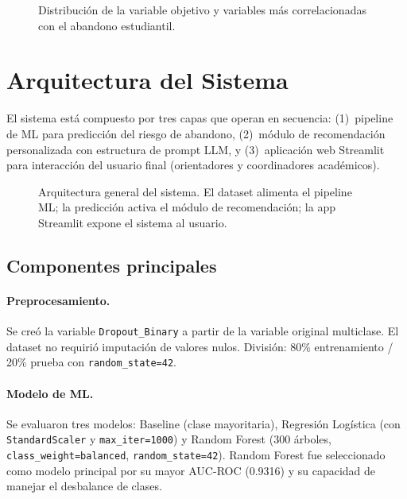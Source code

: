 \documentclass[10pt,twocolumn]{article}
\begin{document}
\begin{figure}[H]
  \centering
  \fbox{\rule{0pt}{2.8cm}\rule{\columnwidth-2\fboxsep}{0pt}}
  \caption{Distribución de la variable objetivo y variables más
           correlacionadas con el abandono estudiantil.}
  \label{fig:eda}
\end{figure}

\section{Arquitectura del Sistema}

El sistema está compuesto por tres capas que operan en secuencia:
(1)~pipeline de ML para predicción del riesgo de abandono,
(2)~módulo de recomendación personalizada con estructura de prompt LLM, y
(3)~aplicación web Streamlit para interacción del usuario final
(orientadores y coordinadores académicos).

\begin{figure}[H]
  \centering
  \fbox{\rule{0pt}{3.2cm}\rule{\columnwidth-2\fboxsep}{0pt}}
  \caption{Arquitectura general del sistema. El dataset alimenta el
           pipeline ML; la predicción activa el módulo de recomendación;
           la app Streamlit expone el sistema al usuario.}
  \label{fig:arq}
\end{figure}

\subsection{Componentes principales}

\paragraph{Preprocesamiento.}
Se creó la variable \texttt{Dropout\_Binary} a partir de la variable
original multiclase. El dataset no requirió imputación de valores nulos.
División: 80\% entrenamiento / 20\% prueba con \texttt{random\_state=42}.

\paragraph{Modelo de ML.}
Se evaluaron tres modelos: Baseline (clase mayoritaria), Regresión
Logística (con \texttt{StandardScaler} y \texttt{max\_iter=1000}) y
Random Forest (300 árboles, \texttt{class\_weight=balanced},
\texttt{random\_state=42}). Random Forest fue seleccionado como modelo
principal por su mayor AUC-ROC (0.9316) y su capacidad de manejar el
desbalance de clases.
\end{document}
